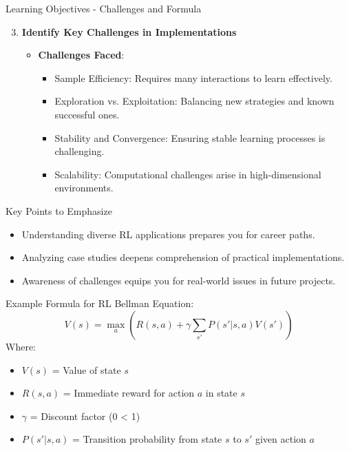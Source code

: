 \documentclass[aspectratio=169]{beamer}
\begin{document}
\begin{frame}[fragile]{Learning Objectives - Challenges and Formula}
  \begin{enumerate}
    \setcounter{enumi}{2}
    \item \textbf{Identify Key Challenges in Implementations}
      \begin{itemize}
        \item \textbf{Challenges Faced}:
          \begin{itemize}
            \item Sample Efficiency: Requires many interactions to learn effectively.
            \item Exploration vs. Exploitation: Balancing new strategies and known successful ones.
            \item Stability and Convergence: Ensuring stable learning processes is challenging.
            \item Scalability: Computational challenges arise in high-dimensional environments.
          \end{itemize}
      \end{itemize}
  \end{enumerate}

  \begin{block}{Key Points to Emphasize}
    \begin{itemize}
      \item Understanding diverse RL applications prepares you for career paths.
      \item Analyzing case studies deepens comprehension of practical implementations.
      \item Awareness of challenges equips you for real-world issues in future projects.
    \end{itemize}
  \end{block}

  \begin{block}{Example Formula for RL}
    Bellman Equation:
    \begin{equation}
    V(s) = \max_a \left( R(s, a) + \gamma \sum_{s'} P(s' | s, a) V(s') \right)
    \end{equation}
    Where:
    \begin{itemize}
      \item \(V(s)\) = Value of state \(s\)
      \item \(R(s, a)\) = Immediate reward for action \(a\) in state \(s\)
      \item \(\gamma\) = Discount factor (0 \leq \gamma < 1)
      \item \(P(s' | s, a)\) = Transition probability from state \(s\) to \(s'\) given action \(a\)
    \end{itemize}
  \end{block}
\end{frame}
\end{document}
